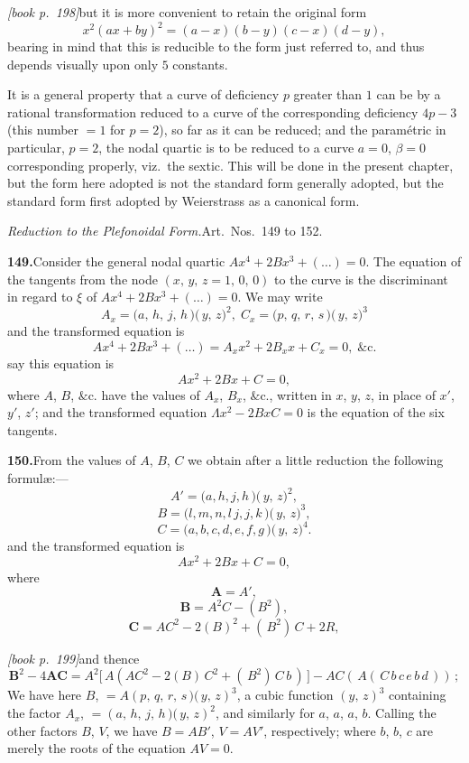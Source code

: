 \documentclass[11pt,a4paper]{article}
\begin{document}
\medskip\noindent\textit{[book p.~198]}\quad but it is more convenient to retain the original form
\[
x^2(ax + by)^2 = (a - x)(b - y)(c - x)(d - y),
\]
bearing in mind that this is reducible to the form just referred to, and thus depends visually upon only $5$ constants.

It is a general property that a curve of deficiency $p$ greater than $1$ can be by a rational transformation reduced to a curve of the corresponding deficiency $4p - 3$ (this number $= 1$ for $p = 2$), so far as it can be reduced; and the param\'etric in particular, $p = 2$, the nodal quartic is to be reduced to a curve $a = 0$, $\beta = 0$ corresponding properly, viz.\ the sextic. This will be done in the present chapter, but the form here adopted is not the standard form generally adopted, but the standard form first adopted by Weierstrass as a canonical form.

\medskip\noindent\textit{Reduction to the Plefonoidal Form.}\quad Art.\ Nos.\ 149 to 152.

\medskip\noindent\textbf{149.}\quad Consider the general nodal quartic $A x^4 + 2 B x^3 + (\ldots) = 0$. The equation of the tangents from the node $(x,\,y,\,z = 1,\,0,\,0)$ to the curve is the discriminant in regard to $\xi$ of $A x^4 + 2 B x^3 + (\ldots) = 0$. We may write
\[
A_x = (a,\,h,\,j,\,h\!\,\mbox{$)\!($}\,y,\,z\bigr)^2,\;C_x = (p,\,q,\,r,\,s\!\,\mbox{$)\!($}\,y,\,z\bigr)^3
\]
and the transformed equation is
\[
A x^4 + 2B x^3 + (\ldots) = A_x x^2 + 2B_x x + C_x = 0,\;\&\text{c.}
\]
say this equation is
\[
A x^2 + 2B x + C = 0,
\]
where $A$, $B$, $\&\text{c.}$ have the values of $A_x$, $B_x$, $\&\text{c.}$, written in $x$, $y$, $z$, in place of $x'$, $y'$, $z'$; and the transformed equation $\Lambda x^2 - 2 B x C = 0$ is the equation of the six tangents.

\medskip\noindent\textbf{150.}\quad From the values of $A$, $B$, $C$ we obtain after a little reduction the following formul\ae{}:---
\[
A' = (a, h, j, h\!\,\mbox{$)\!($}\,y,\,z\bigr)^2,
\]
\[
B = (l, m, n, l\,j, j, k\!\,\mbox{$)\!($}\,y,\,z\bigr)^3,
\]
\[
C = (a, b, c, d, e, f, g\!\,\mbox{$)\!($}\,y,\,z\bigr)^4.
\]
and the transformed equation is
\[
A x^2 + 2B x + C = 0,
\]
where
\[
\mathbf{A} = A',
\]
\[
\mathbf{B} = A^2 C - (B^2),
\]
\[
\mathbf{C} = A C^2 - 2(B)^2 + (\,B^2)\,C + 2 R,
\]

\medskip\noindent\textit{[book p.~199]}\quad and thence
\[
\mathbf{B}^2 - 4 \mathbf{A C} = A^2\bigl[\,A(A C^2 - 2(B)\,C^2 + (\,B^2)\,C\,b\,)\,\bigr] - A C(\,A(\,C\,b\,c\,e\,b\,d\,))\,;
\]
We have here $B$, $= A(p,\,q,\,r,\,s\!\,\mbox{$)\!($}\,y,\,z)^3$, a cubic function $(y,\,z)^3$ containing the factor $A_x$, $= (a,\,h,\,j,\,h\!\,\mbox{$)\!($}\,y,\,z)^2$, and similarly for $a$, $a$, $a$, $b$. Calling the other factors $B$, $V$, we have $B = AB'$, $V = AV'$, respectively; where $b$, $b$, $c$ are merely the roots of the equation $A V = 0$.
\end{document}
